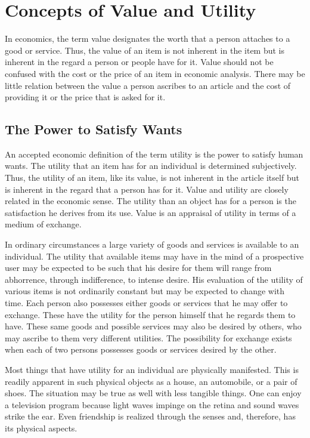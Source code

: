 \section{Concepts of Value and Utility}

In economics, the term value designates the worth that a person attaches to a good or service. Thus, the value of an item is not inherent in the item but is inherent in the regard a person or people have for it. Value should not be confused with the cost or the price of an item in economic analysis. There may be little relation between the value a person ascribes to an article and the cost of providing it or the price that is asked for it.

\subsection{The Power to Satisfy Wants}

An accepted economic definition of the term utility is the power to satisfy human wants. The utility that an item has for an individual is determined subjectively. Thus, the utility of an item, like its value, is not inherent in the article itself but is inherent in the regard that a person has for it. Value and utility are closely related in the economic sense. The utility than an object has for a person is the satisfaction he derives from its use. Value is an appraisal of utility in terms of a medium of exchange.

In ordinary circumstances a large variety of goods and services is available to an individual. The utility that available items may have in the mind of a prospective user may be expected to be such that his desire for them will range from abhorrence, through indifference, to intense desire. His evaluation of the utility of various items is not ordinarily constant but may be expected to change with time. Each person also possesses either goods or services that he may offer to exchange. These have the utility for the person himself that he regards them to have. These same goods and possible services may also be desired by others, who may ascribe to them very different utilities. The possibility for exchange exists when each of two persons possesses goods or services desired by the other.

Most things that have utility for an individual are physically manifested. This is readily apparent in such physical objects as a house, an automobile, or a pair of shoes. The situation may be true as well with less tangible things. One can enjoy a television program because light waves impinge on the retina and sound waves strike the ear. Even friendship is realized through the senses and, therefore, has its physical aspects.
    
